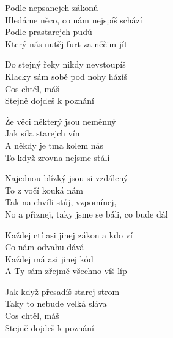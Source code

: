
\re{}

\ve{}
Podle nepsanejch zákonů\\ 
Hledáme něco, co nám nejspíš schází\\
Podle prastarejch pudů\\
Který nás nutěj furt za něčim jít

\ve{}
Do stejný řeky nikdy nevstoupíš\\
Klacky sám sobě pod nohy házíš\\
Cos chtěl, máš\\
Stejně dojdeš k poznání

\cho{}
Že věci některý jsou neměnný\\
Jak síla starejch vín\\
A někdy je tma kolem nás\\
To když zrovna nejsme stálí

Najednou blízký jsou si vzdálený\\
To z vočí kouká nám\\
Tak na chvíli stůj, vzpomínej,\\
No a přiznej, taky jsme se báli, co bude dál

\ve{}
Každej ctí asi jinej zákon a kdo ví\\
Co nám odvahu dává\\
Každej má asi jinej kód\\
A Ty sám zřejmě všechno víš líp

\ve{}
Jak když přesadíš starej strom\\
Taky to nebude velká sláva\\
Cos chtěl, máš\\
Stejně dojdeš k poznání

\cho{}


\esong
